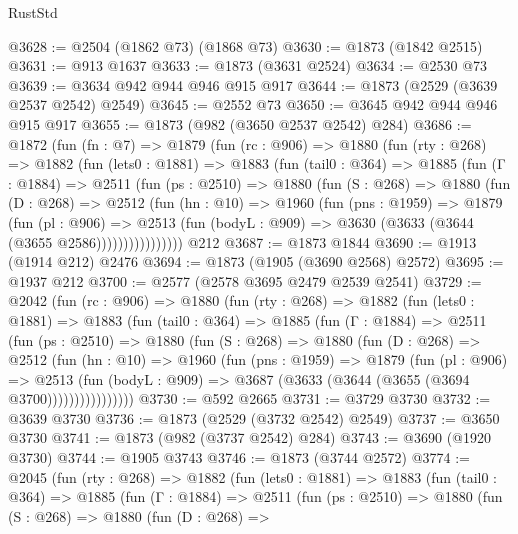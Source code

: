 \begin{lexlean}{RustStd}
\begin{coremodule}
@3628 := @2504 (@1862 @73) (@1868 @73)
@3630 := @1873 (@1842 @2515)
@3631 := @913 @1637
@3633 := @1873 (@3631 @2524)
@3634 := @2530 @73
@3639 := @3634 @942 @944 @946 @915 @917
@3644 := @1873 (@2529 (@3639 @2537 @2542) @2549)
@3645 := @2552 @73
@3650 := @3645 @942 @944 @946 @915 @917
@3655 := @1873 (@982 (@3650 @2537 @2542) @284)
@3686 := @1872
    (fun (fn : @7) =>
    @1879
      (fun (rc : @906) =>
      @1880
        (fun (rty : @268) =>
        @1882
          (fun (lets0 : @1881) =>
          @1883
            (fun (tail0 : @364) =>
            @1885
              (fun (Γ : @1884) =>
              @2511
                (fun (ps : @2510) =>
                @1880
                  (fun (S : @268) =>
                  @1880
                    (fun (D : @268) =>
                    @2512
                      (fun (hn : @10) =>
                      @1960
                        (fun (pns : @1959) =>
                        @1879
                          (fun (pl : @906) =>
                          @2513
                            (fun (bodyL : @909) => @3630 (@3633 (@3644 (@3655 @2586))))))))))))))))
    @212
@3687 := @1873 @1844
@3690 := @1913 (@1914 @212) @2476
@3694 := @1873 (@1905 (@3690 @2568) @2572)
@3695 := @1937 @212
@3700 := @2577 (@2578 @3695 @2479 @2539 @2541)
@3729 := @2042
    (fun (rc : @906) =>
    @1880
      (fun (rty : @268) =>
      @1882
        (fun (lets0 : @1881) =>
        @1883
          (fun (tail0 : @364) =>
          @1885
            (fun (Γ : @1884) =>
            @2511
              (fun (ps : @2510) =>
              @1880
                (fun (S : @268) =>
                @1880
                  (fun (D : @268) =>
                  @2512
                    (fun (hn : @10) =>
                    @1960
                      (fun (pns : @1959) =>
                      @1879
                        (fun (pl : @906) =>
                        @2513
                          (fun (bodyL : @909) =>
                          @3687 (@3633 (@3644 (@3655 (@3694 @3700))))))))))))))))
@3730 := @592 @2665
@3731 := @3729 @3730
@3732 := @3639 @3730
@3736 := @1873 (@2529 (@3732 @2542) @2549)
@3737 := @3650 @3730
@3741 := @1873 (@982 (@3737 @2542) @284)
@3743 := @3690 (@1920 @3730)
@3744 := @1905 @3743
@3746 := @1873 (@3744 @2572)
@3774 := @2045
    (fun (rty : @268) =>
    @1882
      (fun (lets0 : @1881) =>
      @1883
        (fun (tail0 : @364) =>
        @1885
          (fun (Γ : @1884) =>
          @2511
            (fun (ps : @2510) =>
            @1880
              (fun (S : @268) =>
              @1880
                (fun (D : @268) =>

\end{coremodule}
\end{lexlean}
